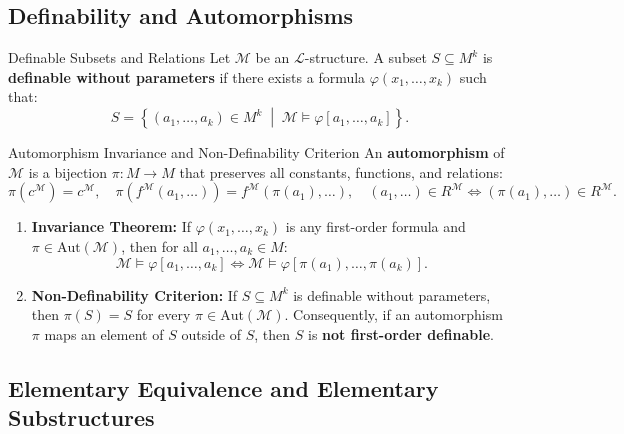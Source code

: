 \subsection{Definability and Automorphisms}

\begin{definitionbox}{Definable Subsets and Relations}
Let $\mathcal{M}$ be an $\mathcal{L}$-structure. A subset $S \subseteq M^k$ is \textbf{definable without parameters} if there exists a formula $\varphi(x_1, \dots, x_k)$ such that:
\[
S = \left\{ (a_1, \dots, a_k) \in M^k \;\middle|\; \mathcal{M} \models \varphi[a_1, \dots, a_k] \right\}.
\]
\end{definitionbox}

\begin{theorembox}{Automorphism Invariance and Non-Definability Criterion}
An \textbf{automorphism} of $\mathcal{M}$ is a bijection $\pi: M \to M$ that preserves all constants, functions, and relations:
\[
\pi(c^\mathcal{M}) = c^\mathcal{M}, \quad \pi(f^\mathcal{M}(a_1,\dots)) = f^\mathcal{M}(\pi(a_1),\dots), \quad (a_1,\dots) \in R^\mathcal{M} \iff (\pi(a_1),\dots) \in R^\mathcal{M}.
\]
\begin{enumerate}[leftmargin=1.4em,itemsep=2pt]
  \item \textbf{Invariance Theorem:} If $\varphi(x_1, \dots, x_k)$ is any first-order formula and $\pi \in \mathrm{Aut}(\mathcal{M})$, then for all $a_1, \dots, a_k \in M$:
  \[
  \mathcal{M} \models \varphi[a_1, \dots, a_k] \iff \mathcal{M} \models \varphi[\pi(a_1), \dots, \pi(a_k)].
  \]
  \item \textbf{Non-Definability Criterion:} If $S \subseteq M^k$ is definable without parameters, then $\pi(S) = S$ for every $\pi \in \mathrm{Aut}(\mathcal{M})$.
  Consequently, if an automorphism $\pi$ maps an element of $S$ outside of $S$, then $S$ is \textbf{not first-order definable}.
\end{enumerate}
\end{theorembox}

\subsection{Elementary Equivalence and Elementary Substructures}

